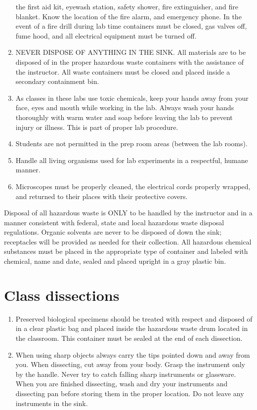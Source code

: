 \documentclass[]{book}
\providecommand{\tightlist}{%
  \setlength{\itemsep}{0pt}\setlength{\parskip}{0pt}}
\theoremstyle{definition}
\theoremstyle{definition}
\theoremstyle{definition}
\theoremstyle{remark}
\begin{document}
\begin{enumerate}
  the first aid kit, eyewash station, safety shower, fire extinguisher,
  and fire blanket. Know the location of the fire alarm, and emergency
  phone. In the event of a fire drill during lab time containers must be
  closed, gas valves off, fume hood, and all electrical equipment must
  be turned off.
\item
  NEVER DISPOSE OF ANYTHING IN THE SINK. All materials are to be
  disposed of in the proper hazardous waste containers with the
  assistance of the instructor. All waste containers must be closed and
  placed inside a secondary containment bin.
\item
  As classes in these labs use toxic chemicals, keep your hands away
  from your face, eyes and mouth while working in the lab. Always wash
  your hands thoroughly with warm water and soap before leaving the lab
  to prevent injury or illness. This is part of proper lab procedure.
\item
  Students are not permitted in the prep room areas (between the lab
  rooms).
\item
  Handle all living organisms used for lab experiments in a respectful,
  humane manner.
\item
  Microscopes must be properly cleaned, the electrical cords properly
  wrapped, and returned to their places with their protective covers.
\end{enumerate}

Disposal of all hazardous waste is ONLY to be handled by the instructor
and in a manner consistent with federal, state and local hazardous waste
disposal regulations. Organic solvents are never to be disposed of down
the sink; receptacles will be provided as needed for their collection.
All hazardous chemical substances must be placed in the appropriate type
of container and labeled with chemical, name and date, sealed and placed
upright in a gray plastic bin.

\section{Class dissections}\label{class-dissections}

\begin{enumerate}
\def\labelenumi{\arabic{enumi}.}
\setcounter{enumi}{13}
\tightlist
\item
  Preserved biological specimens should be treated with respect and
  disposed of in a clear plastic bag and placed inside the hazardous
  waste drum located in the classroom. This container must be sealed at
  the end of each dissection.
\item
  When using sharp objects always carry the tips pointed down and away
  from you. When dissecting, cut away from your body. Grasp the
  instrument only by the handle. Never try to catch falling sharp
  instruments or glassware. When you are finished dissecting, wash and
  dry your instruments and dissecting pan before storing them in the
  proper location. Do not leave any instruments in the sink.
\end{enumerate}
\end{document}
